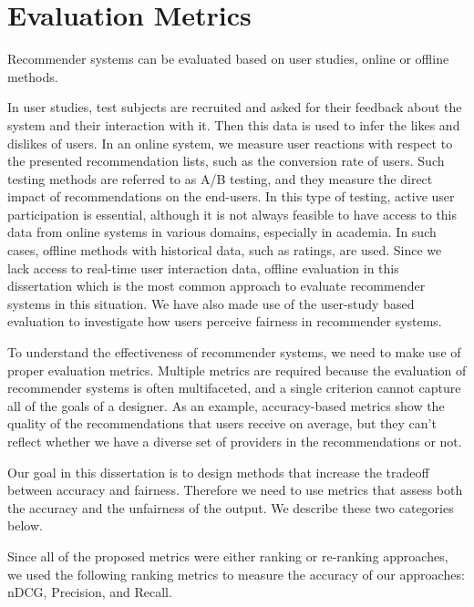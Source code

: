 
\section{Evaluation Metrics}
\label{sec:eval}
    
    Recommender systems can be evaluated based on user studies, online or offline methods.
    
    In user studies, test subjects are recruited and asked for their feedback about the system and their interaction with it. Then this data is used to infer the likes and dislikes of users. 
    In an online system, we measure user reactions with respect to the presented recommendation lists, such as the conversion rate of users. Such testing methods are referred to as A/B testing, and they measure the direct impact of recommendations on the end-users. In this type of testing, active user participation is essential, although it is not always feasible to have access to this data from online systems in various domains, especially in academia. In such cases, offline methods with historical data, such as ratings, are used. Since we lack access to real-time user interaction data, offline evaluation in this dissertation which is the most common approach to evaluate recommender systems in this situation. We have also made use of the user-study based evaluation to investigate  how users perceive fairness in recommender systems.
    
    To understand the effectiveness of recommender systems, we need to make use of proper evaluation metrics. Multiple metrics are required because the evaluation of recommender systems is often multifaceted, and a single criterion cannot capture all of the goals of a designer. As an example, accuracy-based metrics show the quality of the recommendations that users receive on average, but they can't reflect whether we have a diverse set of providers in the recommendations or not. 
    
    Our goal in this dissertation is to design methods that increase the tradeoff between accuracy and fairness. Therefore we need to use metrics that assess both the accuracy and the unfairness of the output. We describe these two categories below.
    
    Since all of the proposed metrics were either ranking or re-ranking approaches, we used the following ranking metrics to measure the accuracy of our approaches: nDCG, Precision, and Recall.
    
